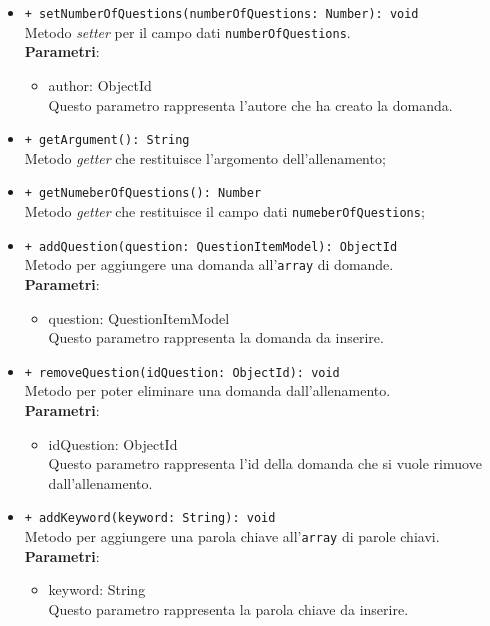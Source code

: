 \begin{itemize}
\begin{itemize}
				\item \texttt{+ setNumberOfQuestions(numberOfQuestions: Number): void} \\
				Metodo \textit{setter} per il campo dati \texttt{numberOfQuestions}.\\
				\textbf{Parametri}:
				\begin{itemize}
					\item {author: ObjectId}\\
					Questo parametro rappresenta l'autore che ha creato la domanda.
				\end{itemize}
				
				\item \texttt{+ getArgument(): String} \\
				Metodo \textit{getter} che restituisce l'argomento dell'allenamento;
				
				\item \texttt{+ getNumeberOfQuestions(): Number} \\
				Metodo \textit{getter} che restituisce il campo dati \texttt{numeberOfQuestions};
				
				\item \texttt{+ addQuestion(question: QuestionItemModel): ObjectId} \\
				Metodo per aggiungere una domanda all'\texttt{array} di domande.\\
				\textbf{Parametri}:
				\begin{itemize}
					\item {question: QuestionItemModel}\\
					Questo parametro rappresenta la domanda da inserire.
				\end{itemize}
				
				\item \texttt{+ removeQuestion(idQuestion: ObjectId): void} \\
				Metodo per poter eliminare una domanda dall'allenamento.\\
				\textbf{Parametri}:
				\begin{itemize}
					\item {idQuestion: ObjectId}\\
					Questo parametro rappresenta l'id della domanda che si vuole rimuove dall'allenamento.
				\end{itemize}
				
				\item \texttt{+ addKeyword(keyword: String): void} \\
				Metodo per aggiungere una parola chiave all'\texttt{array} di parole chiavi.\\
				\textbf{Parametri}:
				\begin{itemize}
					\item {keyword: String}\\
					Questo parametro rappresenta la parola chiave da inserire.
				\end{itemize}
				

\end{itemize}
\end{itemize}
